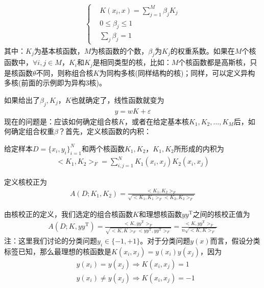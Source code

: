         \begin{align*}
        \left\{
        \begin{aligned}
        & K(x_i,x) = \sum_{j = 1}^M \beta_j K_j\\
        & 0 \leqslant \beta_j \leqslant 1\\
        & \sum_j \beta_j = 1
        \end{aligned}
        \right.
        \end{align*}
        其中：$K_j$为基本核函数，$M$为核函数的个数，$\beta_j$为$K_j$的权重系数。如果在$M$个核函数中，$\forall i,j\in M$，$K_i$和$K_j$是相同类型的核，比如：$M$个核函数都是高斯核，只是核函数$\theta$不同，则称组合核$K$为同构多核(同样结构的核)；同样，可以定义异构多核(前面的示例即为异构3核)。
        \par
        如果给出了$\beta_j,K_j$，$K$也就确定了，线性函数就变为
        \begin{align*}
        y = wK+\varepsilon
        \end{align*}
        现在的问题是：应该如何确定组合核$K$，或者在给定基本核$K_1,K_2,\dots,K_M$后，如何确定组合权重$\beta$？首先，定义核函数的内积：
        \begin{definition}[核函数的内积]
        给定样本$D = \{x_i,y_i\}_{i=1}^N$和两个核函数$K_1,K_2$，$K_1,K_2$所形成的内积为
        \begin{align*}
        \bigl< K_1,K_2 \bigr>_F = \sum_{i,j = 1}^NK_1(x_i,x_j)K_2(x_i,x_j)
        \end{align*}
        \end{definition}
        \begin{definition}[核校正]
        定义核校正为
        \begin{align*}
        A(D;K_1,K_2) = \frac{\bigl< K_1,K_2 \bigr>_F}{\sqrt{\bigl< K_1,K_1 \bigr>_F\bigl< K_2,K_2 \bigr>_F}}
        \end{align*}
        \end{definition}
        由核校正的定义，我们选定的组合核函数$K$和理想核函数$yy^\mathrm{T}$之间的核校正值为
        \begin{align*}
        A(D;K,yy^\mathrm{T}) = \frac{\bigl< K,yy^\mathrm{T}\bigr>_F}{\sqrt{\bigl< K,K \bigr>_F\bigl< yy^\mathrm{T},yy^\mathrm{T} \bigr>_F}} = \frac{\bigl< K,yy^\mathrm{T}\bigr>_F}{n \sqrt{\bigl< K,K \bigr>_F}}
        \end{align*}
        注：这里我们讨论的分类问题$y_i\in \{-1,+1\}$。对于分类问题$y(x)$而言，假设分类标签已知，那么最理想的核函数是$K(x_i,x_j) = y(x_i)y(x_j)$，因为
        \begin{align*}
        &y(x_i) = y(x_j) \Rightarrow K(x_i,x_j) = 1\\
        &y(x_i) \neq y(x_j) \Rightarrow K(x_i,x_j) = -1
        \end{align*}
